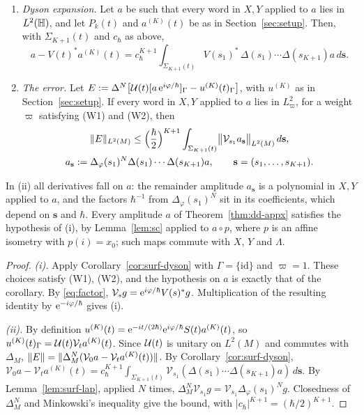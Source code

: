 \begin{proposition}\label{prop:dd-id}
\begin{enumerate}
\item[\textup{(i)}] \emph{Dyson expansion.} Let $a$ be such that every word in $X,Y$ applied to $a$ lies in $L^2(\mathbb{H})$, and let
$P_k(t)$ and $a^{(K)}(t)$ be as in Section~\ref{sec:setup}. Then, with $\Sigma_{K+1}(t)$ and $c_\hbar$ as above,
\[
a-V(t)^*a^{(K)}(t)=c_\hbar^{K+1}\int_{\Sigma_{K+1}(t)}V(s_1)^*\,\Delta(s_1)\cdots\Delta(s_{K+1})a\,d\mathbf s .
\]
\item[\textup{(ii)}] \emph{The error.} Let $E:=\Delta^N\bigl[\mathcal{U}(t)[a\,\mathrm{e}^{i\varphi/\hbar}]_\Gamma-u^{(K)}(t)_\Gamma\bigr]$, with $u^{(K)}$ as in
Section~\ref{sec:setup}. If every word in $X,Y$ applied to $a$ lies in $L^2_\varpi$, for a weight $\varpi$ satisfying \textup{(W1)}
and \textup{(W2)}, then
\[
\begin{gathered}
\lVert E\rVert_{L^2(M)}\le\Bigl(\frac{\hbar}{2}\Bigr)^{K+1}\int_{\Sigma_{K+1}(t)}\bigl\|\mathcal V_{s_1}a_{\mathbf s}\bigr\|_{L^2(M)}\,d\mathbf s,\\
a_{\mathbf s}:=\Delta_\varphi(s_1)^N\Delta(s_1)\cdots\Delta(s_{K+1})a,\qquad\mathbf s=(s_1,\dots,s_{K+1}).
\end{gathered}
\]
\end{enumerate}
\end{proposition}

In (ii) all derivatives fall on $a$: the remainder amplitude $a_{\mathbf s}$ is a polynomial in $X,Y$ applied to $a$, and the
factors $\hbar^{-1}$ from $\Delta_\varphi(s_1)^N$ sit in its coefficients, which depend on $\mathbf s$ and $\hbar$. Every amplitude
$a$ of Theorem~\ref{thm:dd-appx} satisfies the hypothesis of (i), by Lemma~\ref{lem:sc} applied to $a\circ p$, where $p$ is an affine
isometry with $p(i)=x_0$; such maps commute with $X$, $Y$ and $\Lambda$.

\begin{proof}
\medskip\noindent\emph{(i).}
Apply Corollary~\ref{cor:surf-dyson} with $\Gamma=\{\mathrm{id}\}$ and $\varpi=1$.
These choices satisfy (W1), (W2), and the hypothesis on $a$ is exactly that of the corollary.
By \eqref{eq:factor}, $\mathcal V_sg=\mathrm{e}^{i\varphi/\hbar}V(s)^*g$.
Multiplication of the resulting identity by $\mathrm{e}^{-i\varphi/\hbar}$ gives (i).

\medskip\noindent\emph{(ii).}
By definition $u^{(K)}(t)=\mathrm{e}^{-it/(2\hbar)}\mathrm{e}^{i\varphi/\hbar}S(t)a^{(K)}(t)$, so $u^{(K)}(t)_\Gamma=\mathcal{U}(t)\mathcal V_ta^{(K)}(t)$. Since $\mathcal{U}(t)$
is unitary on $L^2(M)$ and commutes with $\Delta_M$, $\lVert E\rVert=\lVert \Delta_M^N(\mathcal V_0a-\mathcal V_ta^{(K)}(t))\rVert$. By Corollary~\ref{cor:surf-dyson},
$\mathcal V_0a-\mathcal V_ta^{(K)}(t)=c_\hbar^{K+1}\int_{\Sigma_{K+1}(t)}\mathcal V_{s_1}(\Delta(s_1)\cdots\Delta(s_{K+1})a)\,d\mathbf s$. By
Lemma~\ref{lem:surf-lap}, applied $N$ times, $\Delta_M^N\mathcal V_{s_1}g=\mathcal V_{s_1}\Delta_\varphi(s_1)^Ng$. Closedness of $\Delta_M^N$
and Minkowski's inequality give the bound, with $|c_\hbar|^{K+1}=(\hbar/2)^{K+1}$.
\end{proof}

